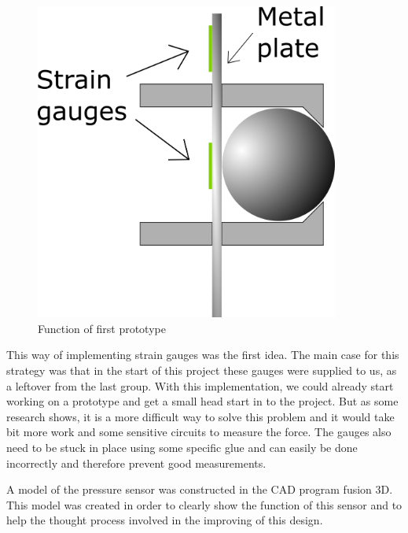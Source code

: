 \begin{figure}[H]
\begin{center}
	\includegraphics[width = 10cm]{Figures/Press_sens_func_1.png}
	\caption{Function of first prototype}
	\label{Press_sens_prot_1}
\end{center}
\end{figure}

This way of implementing strain gauges was the first idea. 
The main case for this strategy was that in the start of this project these gauges were supplied to us, as a leftover from the last group. With this implementation, we could already start working on a prototype and get a small head start in to the project. But as some research shows, it is a more difficult way to solve this problem and it would take bit more work and some sensitive circuits to measure the force. The gauges also need to be stuck in place using some specific glue and can easily be done incorrectly and therefore prevent good measurements.

A model of the pressure sensor was constructed in the CAD program fusion 3D. This model was created in order to clearly show the function of this sensor and to help the thought process involved in the improving of this design.

